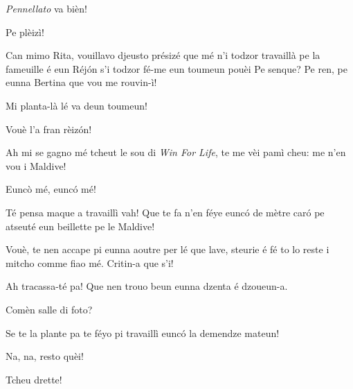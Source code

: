 \begin{drama}
\Eumprezeospeaks \textit{Pennellato} va bièn!

\Ritaspeaks {} Pe plèizì!

\Tobiespeaks Can mimo Rita, vouillavo djeusto présizé que mé n’i todzor travaillà pe la fameuille é eun Réjón s’i todzor fé-me eun toumeun pouèi  Pe senque? Pe ren, pe eunna Bertina que vou me rouvin-ì!

\Eumprezeospeaks Mi planta-là lé va deun toumeun!

\Bertinaspeaks Vouè l’a fran rèizón!

\Tobiespeaks  {} Ah mi se gagno mé tcheut le sou di \textit{Win For Life}, te me vèi pamì cheu: me n'en vou i Maldive!

\Simonspeaks Eunc\`o mé, eunc\'o mé!

\Eumprezeospeaks Té pensa maque a travaillì vah! Que te fa n'en féye eunc\'o de mètre caró pe atseuté eun beillette pe le Maldive!

\Bertinaspeaks {} Vouè, te nen accape pi eunna aoutre per lé que lave, steurie é fé to lo reste i mitcho comme fiao mé. Critin-a que s’i!

\Tobiespeaks Ah tracassa-té pa! Que nen trouo beun eunna dzenta é dzoueun-a.

\Simonspeaks Comèn salle di foto?

\Eumprezeospeaks Se te la plante pa te féyo pi travaillì eunc\'o la demendze mateun!

\Simonspeaks Na, na, resto quèi!


\Pascalspeaks Tcheu drette!



\end{drama}
